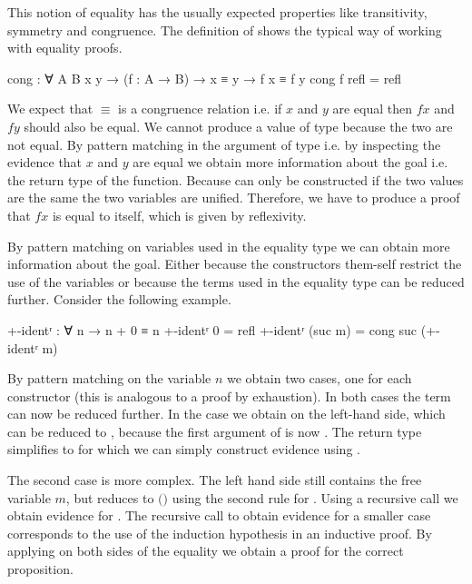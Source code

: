 This notion of equality has the usually expected properties like transitivity,
symmetry and congruence.
The definition of  shows the typical way of working with
equality proofs.

\begin{code}
cong : ∀ {A B x y} → (f : A → B) → x ≡ y → f x ≡ f y
cong f refl = refl
\end{code}
We expect that $≡$ is a congruence relation i.e. if $x$ and $y$ are equal then
$f x$ and $f y$ should also be equal.
We cannot produce a value of type
\AgdaSpace{}\AgdaSpace{}\AgdaSpace{}\AgdaSpace{}
because the two are not equal.
By pattern matching in the argument of type 
\AgdaSpace{}\AgdaSpace{}
i.e. by inspecting the evidence that $x$ and $y$ are equal we obtain more
information about the goal i.e. the return type of the function.
Because  can only be constructed if the two
values are the same the two variables are unified.
Therefore, we have to produce a proof that $f x$ is equal to itself, which is
given by reflexivity.

By pattern matching on variables used in the equality type we can obtain more
information about the goal.
Either because the constructors them-self restrict the use of the variables or
because the terms used in the equality type can be reduced further.
Consider the following example.

\begin{code}
+-identʳ : ∀ n → n + 0 ≡ n
+-identʳ 0        = refl
+-identʳ (suc m)  = cong suc (+-identʳ m)
\end{code}
By pattern matching on the variable $n$ we obtain two cases, one for each
constructor (this is analogous to a proof by exhaustion).
In both cases the term
\AgdaSpace{}\AgdaFunction{}\AgdaSpace{}
can now be reduced further.
In the  case we obtain
\AgdaSpace{}\AgdaFunction{+}\AgdaSpace{}
on the left-hand side, which can be reduced to , because the first
argument of \AgdaFunction{+} is now .
The return type simplifies to 
\AgdaSpace{}\AgdaSpace{}
for which we can simply construct evidence using
.

The second case is more complex.
The left hand side still contains the free variable $m$, but reduces to
\AgdaSpace{}$($\AgdaSpace{}\AgdaFunction{+}\AgdaSpace{}$)$
using the second rule for \AgdaFunction{\_+\_}.
Using a recursive call we obtain evidence for
\AgdaSpace{}\AgdaFunction{+}\AgdaSpace{}\AgdaSpace{}\AgdaSpace{}.
The recursive call to obtain evidence for a smaller case corresponds to the use
of the induction hypothesis in an inductive proof.
By applying  on both sides of the equality we
obtain a proof for the correct proposition.

